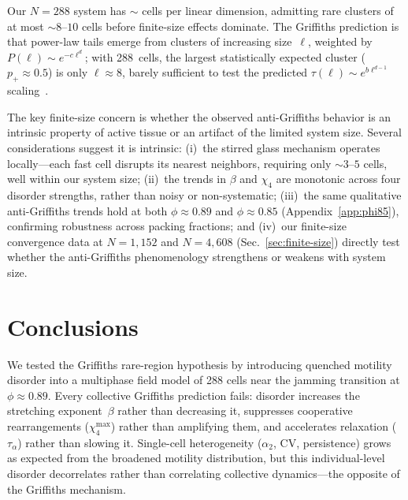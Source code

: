 \documentclass[aps,pre,twocolumn,superscriptaddress,longbibliography,floatfix]{revtex4-2}
\begin{document}
Our $N\!=\!288$ system has $\sim$ cells per linear dimension,
admitting rare clusters of at most $\sim\!8$--$10$ cells before
finite-size effects dominate.  The Griffiths prediction is that
power-law tails emerge from clusters of increasing size~$\ell$,
weighted by $P(\ell)\sim e^{-c\ell^d}$; with 288~cells, the largest
statistically expected cluster ($p_+\!\approx\!0.5$) is only
$\ell\!\approx\!8$, barely sufficient to test the predicted $\tau(\ell)
\sim e^{b\ell^{d-1}}$ scaling~\cite{vojta2006}.

The key finite-size concern is whether the observed anti-Griffiths
behavior is an intrinsic property of active tissue or an artifact of
the limited system size.  Several considerations suggest it is
intrinsic: (i)~the stirred glass mechanism operates
locally---each fast cell disrupts its nearest neighbors, requiring
only $\sim\!3$--$5$ cells, well within our system size;
(ii)~the trends in $\beta$ and $\chi_4$ are monotonic across four
disorder strengths, rather than noisy or non-systematic;
(iii)~the same qualitative anti-Griffiths trends hold at both
$\phi\!\approx\!0.89$ and $\phi\!\approx\!0.85$
(Appendix~\ref{app:phi85}), confirming robustness across packing
fractions;
and (iv)~our finite-size convergence data at $N\!=\!1{,}152$ and
$N\!=\!4{,}608$ (Sec.~\ref{sec:finite-size}) directly test whether
the anti-Griffiths phenomenology strengthens or weakens with system
size.

\section{Conclusions}
\label{sec:conclusions}

We tested the Griffiths rare-region hypothesis by introducing quenched
motility disorder into a multiphase field model of 288 cells near the
jamming transition at $\phi\!\approx\!0.89$.  Every collective Griffiths prediction fails:
disorder increases the stretching exponent~$\beta$
rather than decreasing it, suppresses cooperative rearrangements
($\chi_4^{\max}$) rather than amplifying them, and
accelerates relaxation ($\tau_\alpha$)
rather than slowing it.  Single-cell heterogeneity
($\alpha_2$, CV, persistence) grows as expected from the broadened
motility distribution, but this individual-level disorder decorrelates
rather than correlating collective dynamics---the opposite of the
Griffiths mechanism.
\end{document}
